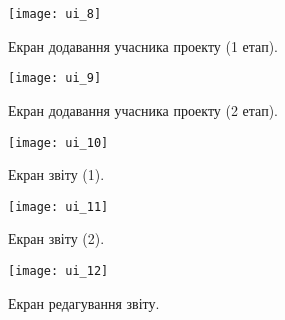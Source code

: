 \begin{figure}[H]
	\centering
	\texttt{[image: ui\_8]}
	\caption{Екран додавання учасника проекту (1 етап).}
	\label{scr_ui_add_project_members_1}
\end{figure}

\begin{figure}[H]
	\centering
	\texttt{[image: ui\_9]}
	\caption{Екран додавання учасника проекту (2 етап).}
	\label{scr_ui_add_project_members_2}
\end{figure}

\begin{figure}[H]
	\centering
	\texttt{[image: ui\_10]}
	\caption{Екран звіту (1).}
	\label{scr_ui_issue_1}
\end{figure}

\begin{figure}[H]
	\centering
	\texttt{[image: ui\_11]}
	\caption{Екран звіту (2).}
	\label{scr_ui_issue_2}
\end{figure}

\begin{figure}[H]
	\centering
	\texttt{[image: ui\_12]}
	\caption{Екран редагування звіту.}
	\label{scr_ui_issue_edit}
\end{figure}